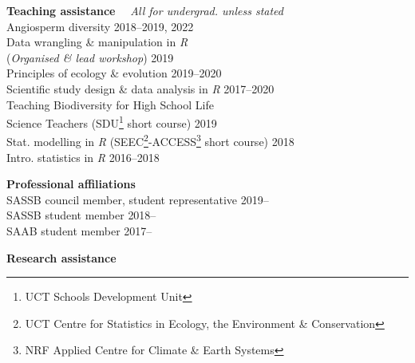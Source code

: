 \documentclass[10pt]{article}
\begin{document}
\begin{multicols}{2}
\columnbreak

\textbf{Teaching assistance} %
  ~~{\small \textmd{\textit{All for undergrad. unless stated}}}\\

Angiosperm diversity                         \hfill {\small 2018--2019, 2022} \\
Data wrangling \& manipulation in \textit{R}                                  \\
\hspace{2em} (\textit{Organised \& lead
  workshop})                                 \hfill {\small             2019} \\
Principles of ecology \& evolution           \hfill {\small       2019--2020} \\
Scientific study design \& data analysis in
  \textit{R}                                 \hfill {\small       2017--2020} \\
Teaching Biodiversity for High School Life                                    \\
\hspace{2em} Science Teachers {\small
  (SDU\footnote{UCT Schools Development Unit}
  short course)}                             \hfill {\small             2019} \\
Stat. modelling in \textit{R} {\small
  (SEEC\footnote{UCT Centre for Statistics in
  Ecology, the Environment \&
  Conservation}-ACCESS\footnote{NRF Applied
  Centre for Climate \& Earth Systems} short
  course)}                                   \hfill {\small             2018} \\
Intro. statistics in \textit{R}              \hfill {\small       2016--2018}

\textbf{Professional affiliations}\\ %

SASSB council member, student representative           \hfill {\small 2019--} \\
SASSB student member                                   \hfill {\small 2018--} \\
SAAB student member                                    \hfill {\small 2017--}

\end{multicols}

\textbf{Research assistance}\\ %
\end{document}
